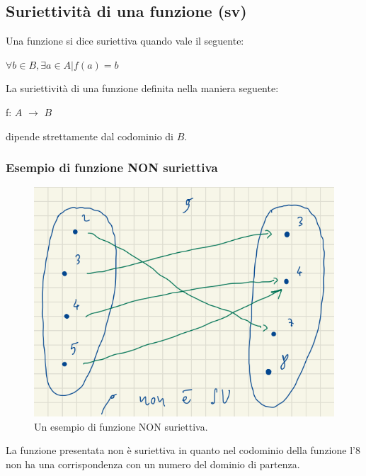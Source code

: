 \documentclass[12pt]{article}
\begin{document}
\subsection{Suriettività di una funzione (sv)}
Una funzione si dice suriettiva quando vale il seguente:
\begin{center}
    $\forall b \in B, \exists a \in A | f(a) = b$
\end{center}
La suriettività di una funzione definita nella maniera seguente:
\begin{center}
    f: $A$ $\rightarrow$ $B$
\end{center}
dipende strettamente dal codominio di $B$.
\subsubsection{Esempio di funzione NON suriettiva}
\begin{figure}[!htb]
    \centering
    \includegraphics[width=.9\linewidth,height=.40\textheight,keepaspectratio]{lezione_1/sv_func.png} %
    \begin{center}
        \caption{\label{fig:no_sv_example}Un esempio di funzione NON suriettiva.} %
    \end{center}
\end{figure}
La funzione presentata non è suriettiva in quanto nel codominio della funzione l'8 non ha una corrispondenza con un numero del dominio di partenza.
\pagebreak
\end{document}
